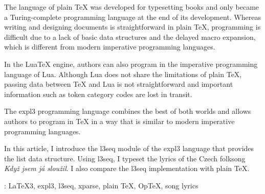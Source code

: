 \documentclass{csbulletin}
\newcommand\pkg{\textsf}
\begin{document}
\begin{summary}
The language of plain \TeX{} was developed for typesetting books and only became a Turing-complete programming language at the end of its development. Whereas writing and designing documents is straightforward in plain \TeX, programming is difficult due to a lack of basic data structures and the delayed macro expansion, which is different from modern imperative programming languages.

In the Lua\TeX{} engine, authors can also program in the imperative programming language of Lua. Although Lua does not share the limitations of plain \TeX, passing data between \TeX{} and Lua is not straightforward and important information such as token category codes are lost in transit.

The expl3 programming language combines the best of both worlds and allows authors to program in \TeX{} in a way that is similar to modern imperative programming languages.

In this article, I introduce the \pkg{l3seq} module of the expl3 language that provides the list data structure. Using \pkg{l3seq}, I typeset the lyrics of the Czech folksong \emph{Když jsem já sloužil}. I also compare the \pkg{l3seq} implementation with plain \TeX.

\keywords: \LaTeX3, expl3, \pkg{l3seq}, \pkg{xparse}, plain \TeX, Op\TeX, song lyrics
\end{summary}

\end{document}
